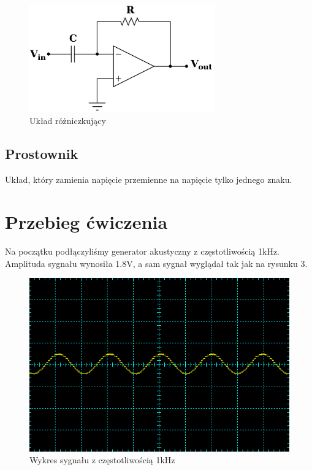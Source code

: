 \documentclass[a4paper,11pt]{article}
\begin{document}
\begin{figure}[h]
 \begin{center}
  \includegraphics[width=8cm]{uklad_rozniczkujacy}
 \end{center}
 \caption{Układ różniczkujący}
\end{figure}

\subsection{Prostownik}
Układ, który zamienia napięcie przemienne na napięcie tylko jednego znaku.



\section{Przebieg ćwiczenia}
Na początku podłączyliśmy generator akustyczny z częstotliwością 1kHz. Amplituda sygnału wynosiła 1.8V, a sam sygnał wyglądał tak jak na rysunku 3.

\begin{figure}[h]
 \begin{center}
  \includegraphics[width=12cm]{gen_akustyczny}
 \end{center}
 \caption{Wykres sygnału z częstotliwością 1kHz}
\end{figure}
\end{document}
